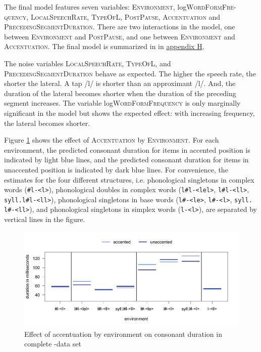 The final model features seven variables: \textsc{Environment}, log\textsc{WordFormFre-quency},  \textsc{LocalSpeechRate}, \textsc{TypeOfL}, \textsc{PostPause}, \textsc{Accentuation} and \textsc{PrecedingSegmentDuration}. 
There are two interactions in the model, one between \textsc{Environment} and \textsc{PostPause}, and one between \textsc{Environment} and \textsc{Accentuation}. The final model is summarized in  in \hyperref[Appendix H: Model Summaries Experiment]{appendix H}.


The noise variables \textsc{LocalSpeechRate}, \textsc{TypeOfL}, and \textsc{PrecedingSegmentDuration} behave as expected. The higher the speech rate, the shorter the lateral. A tap /l/ is shorter than an approximant /l/. And, the duration of the lateral becomes shorter when the duration of the preceding segment increases.
The variable log\textsc{WordFormFrequency} is only marginally significant in the model but shows the expected effect: with increasing frequency, the lateral becomes shorter. 


Figure \ref{fig:Env Acc ly Complete experiment} shows the effect of \textsc{Accentuation} by \textsc{Environment}. For each environment, the predicted consonant duration for items in accented position is indicated by light blue lines, and the predicted consonant duration for  items in unaccented position is indicated by dark blue lines.
 For convenience, the estimates for the four different structures, i.e. phonological singletons in complex words (\texttt{\#l-<l>}), phonological doubles in complex words  (\texttt{l\#l-<lel>}, \texttt{l\#l-<ll>}, \texttt{syll.l\#l-<ll>}), phonological singletons in base words (\texttt{l\#-<le>}, \texttt{l\#-<l>}, \texttt{syll. l\#-<ll>}), and phonological singletons in simplex words (\texttt{l-<l>}), are separated by vertical lines in the figure. 


\begin{figure} [h!]
	\centering

	\includegraphics [scale=0.48] {images/Experiment/LyModelCompleteInterEnvAccLines}

	\caption{Effect of accentuation by environment on consonant duration in complete -data set}
	\label{fig:Env Acc ly Complete experiment}

\end{figure}




